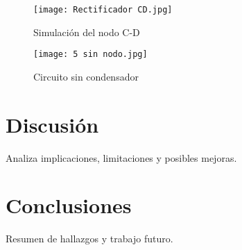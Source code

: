 \documentclass[conference]{IEEEtran} %
\begin{document}
\begin{figure}[htbp]
    \centering
    \texttt{[image: Rectificador CD.jpg]}
    \caption{Simulación del nodo C-D}
    \label{fig:rectificador-simulacion-ab}
\end{figure}


\begin{figure}[htbp]
    \centering
    \texttt{[image: 5 sin nodo.jpg]}
    \caption{Circuito sin condensador}
    \label{fig:rectificador-simulacion-ab}
\end{figure}





\section{Discusión}
Analiza implicaciones, limitaciones y posibles mejoras.

\section{Conclusiones}
Resumen de hallazgos y trabajo futuro.
\end{document}
